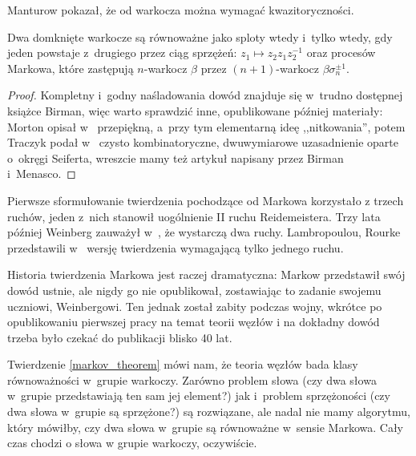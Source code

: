 Manturow \cite{manturov02} pokazał, że od warkocza można wymagać kwazitoryczności.
%

\begin{theorem}[Markow, 1936]
%
\label{markov_theorem}
    Dwa domknięte warkocze są równoważne jako sploty wtedy i~tylko wtedy,
    gdy jeden powstaje z~drugiego przez ciąg
    sprzężeń: $z_1 \mapsto z_2 z_1 z_2^{-1}$ oraz procesów Markowa,
    które zastępują $n$-warkocz $\beta$ przez $(n+1)$-warkocz $\beta\sigma_n^{\pm 1}$.
\end{theorem}

\begin{proof}
%
%
%
%
    Kompletny i~godny naśladowania dowód znajduje się w~trudno dostępnej książce \cite{birman74} Birman, więc warto sprawdzić inne, opublikowane później materiały:
    Morton opisał w~\cite{mortonhr86} przepiękną, a~przy tym elementarną ideę ,,nitkowania'',
    potem Traczyk podał w~\cite{traczyk98} czysto kombinatoryczne, dwuwymiarowe uzasadnienie oparte o~okręgi Seiferta,
    wreszcie mamy też artykuł \cite{birman02} napisany przez Birman i~Menasco.
\end{proof}

Pierwsze sformułowanie twierdzenia pochodzące od Markowa \cite{markov36} korzystało z trzech ruchów, jeden z~nich stanowił uogólnienie II ruchu Reidemeistera.
Trzy lata później Weinberg zauważył w~\cite{weinberg39}, że wystarczą dwa ruchy.
%
Lambropoulou, Rourke przedstawili w~\cite{lambropoulou97} wersję twierdzenia wymagającą tylko jednego ruchu.
%
%

Historia twierdzenia Markowa jest raczej dramatyczna: Markow przedstawił swój dowód ustnie, ale nigdy go nie opublikował, zostawiając to zadanie swojemu uczniowi, Weinbergowi.
Ten jednak został zabity podczas wojny, wkrótce po opublikowaniu pierwszej pracy na temat teorii węzłów i na dokładny dowód trzeba było czekać do publikacji \cite{birman74} blisko 40 lat.

Twierdzenie \ref{markov_theorem} mówi nam, że teoria węzłów bada klasy równoważności w~grupie warkoczy.
Zarówno problem słowa (czy dwa słowa w~grupie przedstawiają ten sam jej element?) jak i~problem sprzężoności (czy dwa słowa w~grupie są sprzężone?) są rozwiązane, ale nadal nie mamy algorytmu, który mówiłby, czy dwa słowa w~grupie są równoważne w~sensie Markowa.
Cały czas chodzi o słowa w grupie warkoczy, oczywiście.

